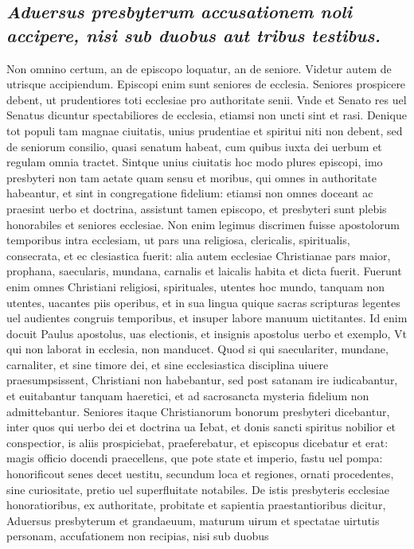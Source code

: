 \documentclass{article}
\begin{document}
\begin{pages}
\subsection*{\textit{Aduersus presbyterum accusationem noli accipere, nisi sub duobus aut tribus testibus. }}\pstart Non omnino certum, an de episcopo loquatur, an de seniore. Videtur autem de utrisque accipiendum. Episcopi enim sunt seniores de ecclesia. Seniores prospicere debent, ut prudentiores toti ecclesiae pro authoritate senii. Vnde et Senato res uel Senatus dicuntur spectabiliores de ecclesia, etiamsi non uncti sint et rasi. Denique tot populi tam magnae ciuitatis, unius prudentiae et spiritui niti non debent, sed de seniorum consilio, quasi senatum habeat, cum quibus iuxta dei uerbum et regulam omnia tractet. Sintque unius ciuitatis hoc modo plures episcopi, imo presbyteri non tam aetate quam sensu et moribus, qui omnes in authoritate habeantur, et sint in congregatione fidelium: etiamsi non omnes doceant ac praesint uerbo et doctrina, assistunt tamen episcopo, et presbyteri sunt plebis honorabiles et seniores ecclesiae. Non enim legimus discrimen fuisse apostolorum temporibus intra ecclesiam, ut pars una religiosa, clericalis, spiritualis, consecrata, et ec clesiastica fuerit: alia autem ecclesiae Christianae pars maior, prophana, saecularis, mundana, carnalis et laicalis habita et dicta fuerit. Fuerunt enim omnes Christiani religiosi, spirituales, utentes hoc mundo, tanquam non utentes, uacantes piis operibus, et in sua lingua quique sacras scripturas legentes uel audientes congruis temporibus, et insuper labore manuum uictitantes. Id enim docuit Paulus apostolus, uas electionis, et insignis apostolus uerbo et exemplo, Vt qui non laborat in ecclesia, non manducet. Quod si qui saeculariter, mundane, carnaliter, et sine timore dei, et sine ecclesiastica disciplina uiuere praesumpsissent, Christiani non habebantur, sed post satanam ire iudicabantur, et euitabantur tanquam haeretici, et ad sacrosancta mysteria fidelium non admittebantur. Seniores itaque Christianorum bonorum presbyteri dicebantur, inter quos qui uerbo dei et doctrina ua Iebat, et donis sancti spiritus nobilior et conspectior, is aliis prospiciebat, praeferebatur, et episcopus dicebatur et erat: magis officio docendi praecellens, que pote state et imperio, fastu uel pompa: honorificout senes decet uestitu, secundum loca et regiones, ornati procedentes, sine curiositate, pretio uel superfluitate notabiles. De istis presbyteris ecclesiae honoratioribus, ex authoritate, probitate et sapientia praestantioribus dicitur, Aduersus presbyterum et grandaeuum, maturum uirum et spectatae uirtutis personam, accufationem non recipias, nisi sub duobus  \pend

\end{pages}
\end{document}
